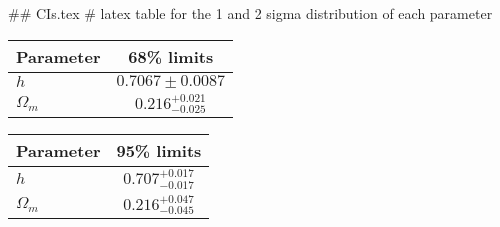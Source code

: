 ## CIs.tex
# latex table for the 1 and 2 sigma distribution of each parameter

\begin{tabular} { l  c}
 Parameter &  68\% limits\\
\hline
{\boldmath$h              $} & $0.7067\pm 0.0087          $\\
{\boldmath$\Omega_m       $} & $0.216^{+0.021}_{-0.025}   $\\
\hline
\end{tabular}

\begin{tabular} { l  c}
 Parameter &  95\% limits\\
\hline
{\boldmath$h              $} & $0.707^{+0.017}_{-0.017}   $\\
{\boldmath$\Omega_m       $} & $0.216^{+0.047}_{-0.045}   $\\
\hline
\end{tabular}
